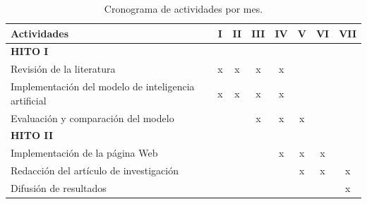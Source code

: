 \documentclass[a4paper]{article}
\begin{document}
\begin{table}[H]
	\centering
	\setlength{\tabcolsep}{0.5em} %
	{\renewcommand{\arraystretch}{1.2}%
		\caption{Cronograma de actividades por mes.}
		\label{tab:actv}
	\begin{tabular}{|p{7.8cm}|c|c|c|c|c|c|c|} \hline
		\textbf{Actividades}                                              & I & II & III & IV & V & VI & VII  \\ \hline
		
		\textbf{HITO I} & & & & & & & \\
		Revisión de la literatura                              & x                     & x                      & x                       & x                      &                       &                        &                                                  \\
		Implementación del modelo de inteligencia artificial                             &       x                &           x             &                x         & x                      &                       &                        &                                                \\
		Evaluación y comparación del modelo     &                       &                        & x                       & x                      & x                     &                        &                                                   \\
		
		\textbf{HITO II} & & & & & & & \\
		Implementación de la página Web &                       &                        &                         & x                      & x                     & x                      &                                                  \\
		Redacción del artículo de investigación                                        &                       &                        &                         &                        & x                     & x                      & x                                              \\
		Difusión de resultados                                  &                       &                        &                         &                       &                      &                       & x                                             \\ \hline
	\end{tabular}
}
\end{table}
\end{document}
